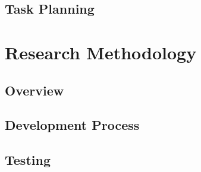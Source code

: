 \subsection{Task Planning}

%
%

%
%



\section{Research Methodology}

\subsection{Overview}

\subsection{Development Process}

\subsection{Testing}




